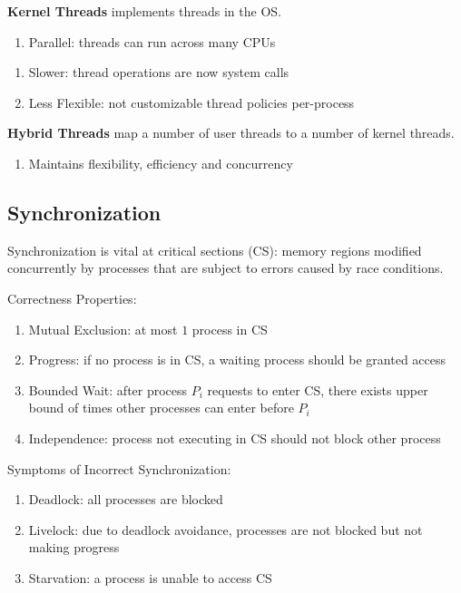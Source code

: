 \documentclass[12pt, a4paper]{article}
\begin{document}
\begin{multicols*}{3}
\textbf{Kernel Threads} implements threads in the OS.
\begin{enumerate}[$+$]
  \item Parallel: threads can run across many CPUs 
\end{enumerate}\vspace{-1pt}
\begin{enumerate}[$-$]
  \item Slower: thread operations are now system calls
  \item Less Flexible: not customizable thread policies per-process
\end{enumerate}

\textbf{Hybrid Threads} map a number of user threads to a number of kernel threads.
\begin{enumerate}[$+$]
  \item Maintains flexibility, efficiency and concurrency
\end{enumerate}
\vspace{-1em}
\colbreak
\subsection{Synchronization}
Synchronization is vital at critical sections (CS): memory regions modified concurrently by processes that are subject to errors caused by race conditions.

Correctness Properties:
\begin{enumerate}[\roman*.]
  \item Mutual Exclusion: at most $1$ process in CS
  \item Progress: if no process is in CS, a waiting process should be granted access 
  \item Bounded Wait: after process $P_i$ requests to enter CS, there exists upper bound of times other processes can enter before $P_i$
  \item Independence: process not executing in CS should not block other process 
\end{enumerate}

Symptoms of Incorrect Synchronization:
\begin{enumerate}[\roman*.]
  \item Deadlock: all processes are blocked
  \item Livelock: due to deadlock avoidance, processes are not blocked but not making progress 
  \item Starvation: a process is unable to access CS 
\end{enumerate}


\end{multicols*}
\end{document}
